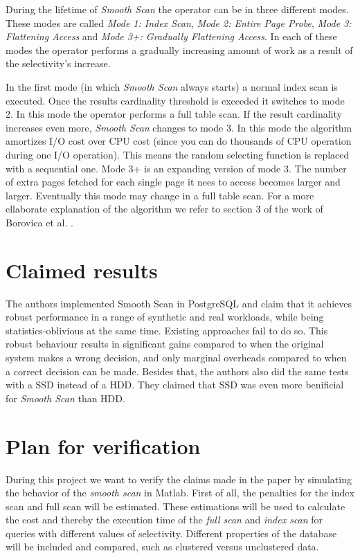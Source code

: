 \documentclass[a4paper,11pt,twoside]{article}
\begin{document}
During the lifetime of \emph{Smooth Scan} the operator can be in three different modes. These modes are called \emph{Mode 1: Index Scan}, \emph{Mode 2: Entire Page Probe}, \emph{Mode 3: Flattening Access} and \emph{Mode 3+: Gradually Flattening Access}. In each of these modes the operator performs a gradually increasing amount of work as a result of the selectivity's increase.

In the first mode (in which \emph{Smooth Scan} always starts) a normal index scan is executed. Once the results cardinality threshold is exceeded it switches to mode 2. In this mode the operator performs a full table scan. If the result cardinality increases even more, \emph{Smooth Scan} changes to mode 3. In this mode the algorithm amortizes I/O cost over CPU cost (since you can do thousands of CPU operation during one I/O operation). This means the random selecting function is replaced with a sequential one. Mode 3+ is an expanding version of mode 3. The number of extra pages fetched for each single page it nees to access becomes larger and larger. Eventually this mode may change in a full table scan. For a more ellaborate explanation of the algorithm we refer to section 3 of the work of Borovica et al. \cite{smoothscan}.

\section{Claimed results}
The authors implemented Smooth Scan in PostgreSQL and claim that it achieves robust performance in a range of synthetic and real workloads, while being statistics-oblivious at the same time. Existing approaches fail to do so. This robust behaviour results in significant gains compared to when the original system makes a wrong decision, and only marginal overheads compared to when a correct decision can be made. Besides that, the authors also did the same tests with a SSD instead of a HDD. They claimed that SSD was even more benificial for \emph{Smooth Scan} than HDD.

\section{Plan for verification}
During this project we want to verify the claims made in the paper by simulating the behavior of the \emph{smooth scan} in Matlab. First of all, the penalties for the index scan and full scan will be estimated. These estimations will be used to calculate the cost and thereby the execution time of the \emph{full scan} and \emph{index scan} for queries with different values of selectivity. Different properties of the database will be included and compared, such as clustered versus unclustered data.
\end{document}
